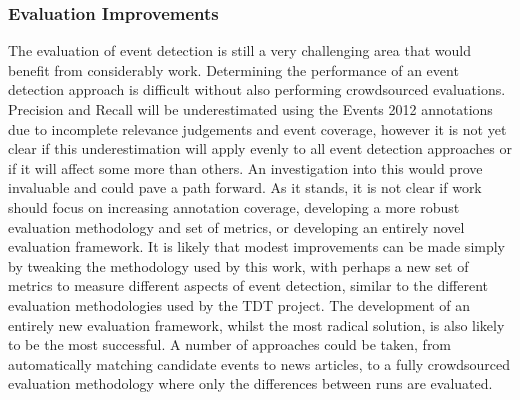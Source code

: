 \subsubsection{Evaluation Improvements}
The evaluation of event detection is still a very challenging area that would benefit from considerably work.
Determining the performance of an event detection approach is difficult without also performing crowdsourced evaluations.
Precision and Recall will be underestimated using the Events 2012 annotations due to incomplete relevance judgements and event coverage, however it is not yet clear if this underestimation will apply evenly to all event detection approaches or if it will affect some more than others.
An investigation into this would prove invaluable  and could pave a path forward.
As it stands, it is not clear if work should focus on increasing annotation coverage, developing a more robust evaluation methodology and set of metrics, or developing an entirely novel evaluation framework.
It is likely that modest improvements can be made simply by tweaking the methodology used by this work, with perhaps a new set of metrics to measure  different aspects of event detection, similar to the different evaluation methodologies used by the TDT project.
The development of an entirely new evaluation framework, whilst the most radical solution, is also likely to be the most successful.
A number of approaches could be taken, from automatically matching candidate events to news articles, to a fully crowdsourced evaluation methodology where only the differences between runs are evaluated.

